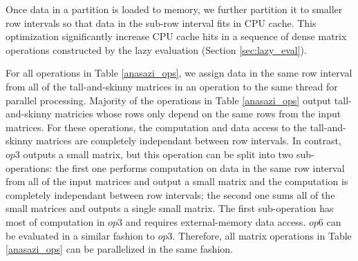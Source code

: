 Once data in a partition is loaded to memory, we further partition it to
smaller row intervals so that data
in the sub-row interval fits in CPU cache.  This optimization significantly
increase CPU cache hits in a sequence of dense matrix operations constructed by
the lazy evaluation (Section \ref{sec:lazy_eval}).

For all operations in Table \ref{anasazi_ops}, we assign data in the same row
interval from all of the tall-and-skinny
matrices in an operation to the same thread for parallel processing.
Majority of the operations in Table \ref{anasazi_ops} output tall-and-skinny
matricies whose rows only depend on the same rows from the input matrices.
For these operations, the computation and data access to the tall-and-skinny
matrices are completely independant between row intervals. 
In contrast, $op3$ outputs a small matrix, but this operation can be split into
two sub-operations: the first one performs computation on data in the same row
interval from all of the input matrices and output a small matrix and the computation
is completely independant between row intervals; the second one sums all of
the small matrices and outputs a single small matrix. The first sub-operation
has most of computation in $op3$ and requires external-memory data access.
$op6$ can be evaluated in a similar fashion to $op3$. Therefore, all matrix
operations in Table \ref{anasazi_ops} can be parallelized in the same fashion.


